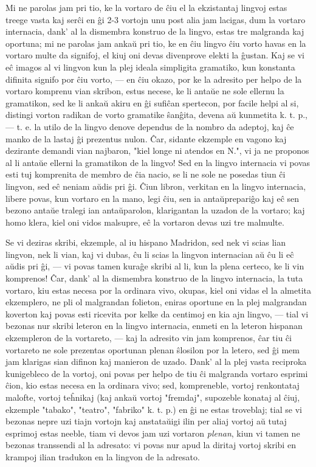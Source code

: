    Mi ne parolas jam pri tio, ke la vortaro de \^ciu el la ekzistantaj
lingvoj estas treege vasta kaj ser\^ci en \^gi 2-3 vortojn unu post
alia jam lacigas, dum la vortaro internacia, dank' al la dismembra
konstruo de la lingvo, estas tre malgranda kaj oportuna; mi ne
parolas jam anka\u u pri tio, ke en \^ciu lingvo \^ciu vorto havas
en la vortaro multe da signifoj, el kiuj oni devas divenprove elekti
la \^gustan. Kaj se vi e\^c imagos al vi lingvon kun la plej ideala
simpligita gramatiko, kun konstanta difinita signifo por \^ciu
vorto, --- en \^ciu okazo, por ke la adresito per helpo de la
vortaro komprenu vian skribon, estus necese, ke li anta\u ue ne sole
ellernu la gramatikon, sed ke li anka\u u akiru en \^gi sufi\^can
spertecon, por facile helpi al si, distingi vorton radikan de vorto
gramatike \^san\^gita, devena a\u u kunmetita k. t. p., --- t. e. la
utilo de la lingvo denove dependus de la nombro da adeptoj, kaj \^ce
manko de la lastaj \^gi prezentus nulon. \^Car, sidante ekzemple en
vagono kaj dezirante demandi vian najbaron, "kiel longe ni atendos
en N.", vi ja ne proponos al li anta\u ue ellerni la gramatikon de
la lingvo! Sed en la lingvo internacia vi povas esti tuj komprenita
de membro de \^cia nacio, se li ne sole ne posedas tiun \^ci
lingvon, sed e\^c neniam a\u udis pri \^gi. \^Ciun libron, verkitan
en la lingvo internacia, libere povas, kun vortaro en la mano, legi
\^ciu, sen ia anta\u uprepari\^go kaj e\^c sen bezono anta\u ue
tralegi ian anta\u uparolon, klarigantan la uzadon de la vortaro;
kaj homo klera, kiel oni vidos malsupre, e\^c la vortaron devas uzi
tre malmulte.

   Se vi deziras skribi, ekzemple, al iu hispano Madridon, sed nek vi
scias lian lingvon, nek li vian, kaj vi dubas, \^cu li scias la
lingvon internacian a\u u \^cu li e\^c a\u udis pri \^gi, --- vi
povas tamen kura\^ge skribi al li, kun la plena certeco, ke li vin
komprenos! \^Car, dank' al la dismembra konstruo de la lingvo
internacia, la tuta vortaro, kiu estas necesa por la ordinara vivo,
okupas, kiel oni vidas el la almetita ekzemplero, ne pli ol
malgrandan folieton, eniras oportune en la plej malgrandan koverton
kaj povas esti ricevita por kelke da centimoj en kia ajn lingvo,
--- tial vi bezonas nur skribi leteron en la lingvo internacia,
enmeti en la leteron hispanan ekzempleron de la vortareto, --- kaj
la adresito vin jam komprenos, \^car tiu \^ci vortareto ne sole
prezentas oportunan plenan \^slosilon por la letero, sed \^gi mem
jam klarigas sian difinon kaj manieron de uzado. Dank' al la plej
vasta reciproka kunigebleco de la vortoj, oni povas per helpo de tiu
\^ci malgranda vortaro esprimi \^cion, kio estas necesa en la
ordinara vivo; sed, kompreneble, vortoj renkontataj malofte, vortoj
te\^hnikaj (kaj anka\u u vortoj "fremdaj", supozeble konataj al
\^ciuj, ekzemple "tabako", "teatro", "fabriko" k. t. p.) en
\^gi ne estas troveblaj; tial se vi bezonas nepre uzi tiajn vortojn
kaj anstata\u uigi ilin per aliaj vortoj a\u u tutaj esprimoj estas
neeble, tiam vi devos jam uzi vortaron {\sl plenan}, kiun vi tamen
ne bezonas transsendi al la adresato: vi povas nur apud la diritaj
vortoj skribi en krampoj ilian tradukon en la lingvon de la
adresato.

